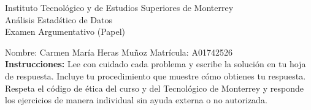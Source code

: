 \documentclass[10pt]{report}
\begin{document}
\newpage



\begin{center}
{\large Instituto Tecnol\'{o}gico y de Estudios Superiores de Monterrey \\
An\'alisis Estad\'stico de Datos } \\
Examen Argumentativo (Papel)
\end{center}

Nombre: \underline{\hspace*{.2in}}
Carmen Mar\'ia Heras Mu\~noz
\underline{\hspace*{.2in}} \quad Matr\'icula:\underline{\hspace*{.2in}}
A01742526
\underline{\hspace*{.2in}} \\

{\bf Instrucciones:} Lee con cuidado cada problema y escribe la soluci\'on
en tu hoja de respuesta. Incluye tu procedimiento que muestre c\'omo obtienes tu respuesta.  Respeta el c\'odigo de \'etica del curso y del Tecnol\'ogico de Monterrey y responde los ejercicios de manera individual sin ayuda externa o no autorizada.
\end{document}
